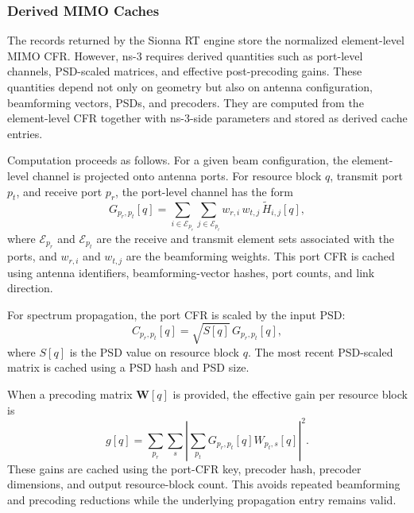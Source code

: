 \subsubsection{Derived MIMO Caches}
\label{subsec:derived-mimo-caches}

The records returned by the Sionna RT engine store the normalized element-level MIMO CFR.
However, ns-3 requires derived quantities such as port-level channels, PSD-scaled matrices, and effective post-precoding gains.
These quantities depend not only on geometry but also on antenna configuration, beamforming vectors, PSDs, and precoders.
They are computed from the element-level CFR together with ns-3-side parameters and stored as derived cache entries.

Computation proceeds as follows.
For a given beam configuration, the element-level channel is projected onto
antenna ports.
For resource block $q$, transmit port $p_t$, and receive port
$p_r$, the port-level channel has the form
\begin{equation}
    G_{p_r,p_t}[q]
    =
    \sum_{i\in\mathcal{E}_{p_r}}
    \sum_{j\in\mathcal{E}_{p_t}}
    w_{r,i}\,w_{t,j}\,
    \widetilde{H}_{i,j}[q],
\end{equation}
where $\mathcal{E}_{p_r}$ and $\mathcal{E}_{p_t}$ are the receive and transmit
element sets associated with the ports, and $w_{r,i}$ and $w_{t,j}$ are the
beamforming weights.
This port CFR is cached using antenna identifiers,
beamforming-vector hashes, port counts, and link direction.

For spectrum propagation, the port CFR is scaled by the input PSD:
\begin{equation}
    C_{p_r,p_t}[q]
    =
    \sqrt{S[q]}\,G_{p_r,p_t}[q],
\end{equation}
where $S[q]$ is the PSD value on resource block $q$. The most recent
PSD-scaled matrix is cached using a PSD hash and PSD size.

When a precoding matrix $\mathbf{W}[q]$ is provided, the effective gain per
resource block is
\begin{equation}
    g[q]
    =
    \sum_{p_r}\sum_s
    \left|
    \sum_{p_t} G_{p_r,p_t}[q] W_{p_t,s}[q]
    \right|^2 .
\end{equation}
These gains are cached using the port-CFR key, precoder hash, precoder
dimensions, and output resource-block count.
This avoids repeated beamforming and precoding reductions while the underlying propagation entry remains valid.
